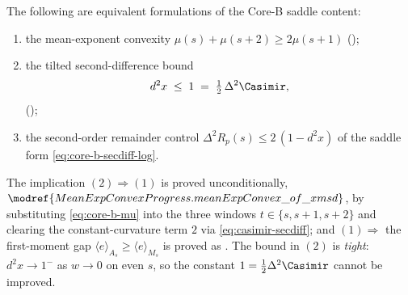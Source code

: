 \begin{proposition}
\label{prop:core-b-unify}
The following are equivalent formulations of the Core-B saddle content:
\begin{enumerate}
\item the mean-exponent convexity $\mu(s)+\mu(s+2)\ge 2\mu(s+1)$
  ();
\item the tilted second-difference bound
  \[
    d^2 x \;\le\; 1
      \;=\; \tfrac12\,\Delta^2\Casimir,
  \]
  ();
\item the second-order remainder control $\Delta^2 R_p(s)\le 2\,(1-d^2 x)$ of the
  saddle form \eqref{eq:core-b-secdiff-log}.
\end{enumerate}
The implication $\mathrm{(2)}\Rightarrow\mathrm{(1)}$ is proved unconditionally,
$\modref{MeanExpConvexProgress.meanExpConvex\_of\_xmsd}$, by substituting
\eqref{eq:core-b-mu} into the three windows $t\in\{s,s+1,s+2\}$ and clearing the
constant-curvature term $2$ via \eqref{eq:casimir-secdiff}; and
$\mathrm{(1)}\Rightarrow$ the first-moment gap
$\langle e\rangle_{A_s}\ge\langle e\rangle_{M_s}$ is proved as
.  The bound in
$\mathrm{(2)}$ is \emph{tight}: $d^2 x\to 1^{-}$ as $w\to 0$ on even $s$, so the
constant $1=\tfrac12\Delta^2\Casimir$ cannot be improved.
\end{proposition}

